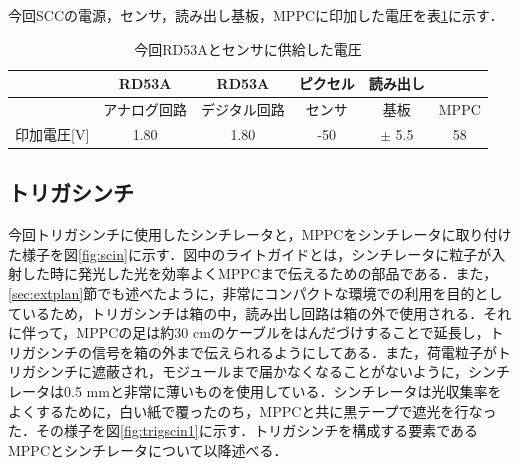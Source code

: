 今回SCCの電源，センサ，読み出し基板，MPPCに印加した電圧を表\ref{tab:extvol}に示す．
\begin{table}[h]
  \centering
  \caption{今回RD53Aとセンサに供給した電圧}
  \begin{tabular} {l|cc|c|c|c} \hline
     & RD53A & RD53A & ピクセル & 読み出し & \\ \hline
     & アナログ回路 & デジタル回路 & センサ & 基板 & MPPC \\ \hline
    印加電圧[$\mathrm{V}$] & 1.80 & 1.80 & -50 & $\pm$ 5.5 & 58\\ \hline
  \end{tabular}
  \label{tab:extvol}
\end{table}


\subsection{トリガシンチ}
今回トリガシンチに使用したシンチレータと，MPPCをシンチレータに取り付けた様子を図\ref{fig:scin}に示す．図中のライトガイドとは，シンチレータに粒子が入射した時に発光した光を効率よくMPPCまで伝えるための部品である．また，\ref{sec:extplan}節でも述べたように，非常にコンパクトな環境での利用を目的としているため，トリガシンチは箱の中，読み出し回路は箱の外で使用される．それに伴って，MPPCの足は約30 $\mathrm{cm}$のケーブルをはんだづけすることで延長し，トリガシンチの信号を箱の外まで伝えられるようにしてある．また，荷電粒子がトリガシンチに遮蔽され，モジュールまで届かなくなることがないように，シンチレータは0.5 $\mathrm{mm}$と非常に薄いものを使用している．シンチレータは光収集率をよくするために，白い紙で覆ったのち，MPPCと共に黒テープで遮光を行なった．その様子を図\ref{fig:trigscin1}に示す．トリガシンチを構成する要素であるMPPCとシンチレータについて以降述べる．

